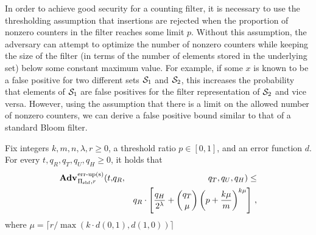 In order to achieve good security for a counting filter, it is necessary to use the thresholding assumption that insertions are rejected when the proportion of nonzero counters in the filter reaches some limit $p$. Without this assumption, the adversary can attempt to optimize the number of nonzero counters while keeping the size of the filter (in terms of the number of elements stored in the underlying set) below some constant maximum value. For example, if some $x$ is known to be a false positive for two different sets $\mathcal{S}_1$ and $\mathcal{S}_2$, this increases the probability that elements of $\mathcal{S}_1$ are false positives for the filter representation of $\mathcal{S}_2$ and vice versa. However, using the assumption that there is a limit on the allowed number of nonzero counters, we can derive a false positive bound similar to that of a standard Bloom filter.

\begin{theorem}\label{thm:count-bf-bound}
Fix integers $k, m, n, \lambda, r\geq 0$, a threshold ratio $p \in [0,1]$, and an error function $d$.
  For every $t, q_R, q_T, q_U, q_H \geq 0$, it holds that
  \begin{eqnarray*}
    \Adv{\erreps}_{\struct_\saltybloom,r}(t,&q_R,& q_T, q_U, q_H) \leq \\ && q_R \cdot \left[\frac{q_H}{2^\lambda} + \binom{q_T}{\mu}\left(p+\frac{k\mu}{m}\right)^{k\mu}\right] \,,
\end{eqnarray*}
where $\mu = \lceil r/\max(k \cdot d(0,1), d(1,0)) \rceil$
\end{theorem}

